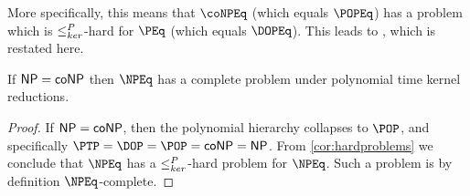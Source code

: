 More specifically, this means that $\coNPEq$ (which equals $\POPEq$) has a problem which is $\leq^{P}_{ker}$-hard for $\PEq$ (which equals $\DOPEq$).
This leads to \autocite[Theorem~8.7, part~1]{bcffm}, which is restated here.

\begin{corollary}
  If ${\mathsf{NP}} = {\mathsf{coNP}}$ then $\NPEq$ has a complete problem under polynomial time kernel reductions.
\end{corollary}
\begin{proof}
  If ${\mathsf{NP}} = {\mathsf{coNP}}$, then the polynomial hierarchy collapses to $\POP$, and specifically $\PTP = \DOP = \POP = \coNP = \NP$.
  From \autoref{cor:hardproblems} we conclude that $\NPEq$ has a $\leq^{P}_{ker}$-hard problem for $\NPEq$.
  Such a problem is by definition $\NPEq$-complete.
\end{proof}


